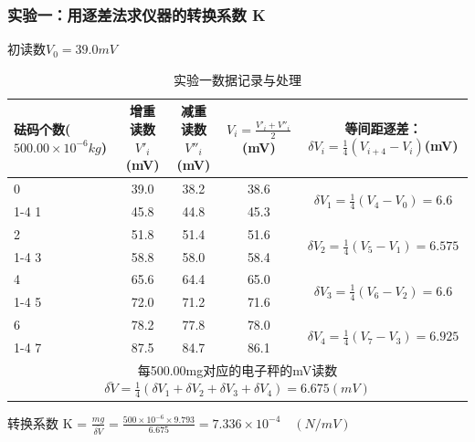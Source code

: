 \documentclass[]{../模板/Report}%
\begin{document}
\begin{fullreportonly}
\subsubsection{实验一：用逐差法求仪器的转换系数 K}
初读数$V_0 = 39.0mV$
\begin{table}[H]
    \centering
    \caption{实验一数据记录与处理}
    \begin{tabular}{|p{6em}|c|c|c|c|}
        \hline
        \textbf{砝码个数($500.00 \times 10^{-6}kg$)} & \textbf{增重读数$V'_i$(mV)} & \textbf{减重读数$V''_i$(mV)} & $V_i = \frac{V'_i + V''_i}{2}$(mV) & \textbf{等间距逐差：$\delta V_i = \frac{1}{4}(V_{i+4} - V_i)$(mV)}  \\
        \hline
        0 & 39.0 & 38.2 & 38.6 & \multirow{2}{*}{$\delta V_1=\frac{1}{4}(V_4-V_0) = 6.6$} \\
        \cline{1-4}
        1 & 45.8 & 44.8 & 45.3 &  \\
        \hline
        2 & 51.8 & 51.4 & 51.6 & \multirow{2}{*}{$\delta V_2=\frac{1}{4}(V_5-V_1) = 6.575$} \\
        \cline{1-4}
        3 & 58.8 & 58.0 & 58.4 &  \\
        \hline
        4 & 65.6 & 64.4 & 65.0 & \multirow{2}{*}{$\delta V_3=\frac{1}{4}(V_6-V_2) = 6.6$} \\
        \cline{1-4}
        5 & 72.0 & 71.2 & 71.6 &  \\
        \hline
        6 & 78.2 & 77.8 & 78.0 & \multirow{2}{*}{$\delta V_4=\frac{1}{4}(V_7-V_3) = 6.925$} \\
        \cline{1-4}
        7 & 87.5 & 84.7 & 86.1 &  \\
        \hline
        \multicolumn{5}{|c|}{每500.00mg对应的电子秤的mV读数$\bar{\delta V} = \frac{1}{4}(\delta V_1 + \delta V_2 + \delta V_3 + \delta V_4) = 6.675(mV)$}  \\
        \hline
    \end{tabular}
\end{table}
转换系数 K = $\frac{mg}{\bar{\delta V}} = \frac{500 \times 10^{-6} \times 9.793}{6.675} = 7.336 \times 10^{-4} \quad (N/mV)$


\end{fullreportonly}
\end{document}
